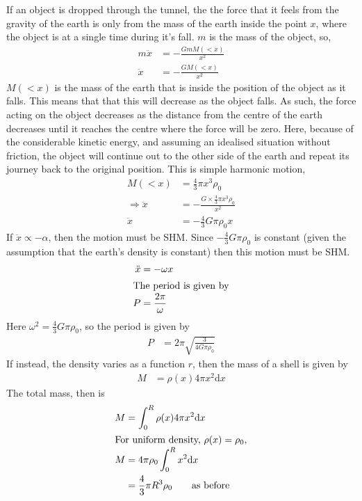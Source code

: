 \documentclass[british]{article}
\renewcommand{\d}{\mathrm{d}} %
\newcommand{\sintertext}[1]{\intertext{#1}\\[-0.7cm]}
\begin{document}
If an object is dropped through the tunnel, the the force that it feels from the gravity of the earth is only from the mass of the earth inside the point $x$, where the object is at a single time during it's fall. $m$ is the mass of the object, so,
\begin{align*}
	m\ddot{x} &= -\frac{GmM(<x)}{x^2} \\
	\ddot{x} &= -\frac{GM(<x)}{x^2}
\end{align*}
$M(<x)$ is the mass of the earth that is inside the position of the object as it falls. This means that that this will decrease as the object falls. As such, the force acting on the object decreases as the distance from the centre of the earth decreases until it reaches the centre where the force will be zero. Here, because of the considerable kinetic energy, and assuming an idealised situation without friction, the object will continue out to the other side of the earth and repeat its journey back to the original position. This is simple harmonic motion,
\begin{align*}
	M(<x) &= \frac{4}{3} \pi x^3 \rho_0 \\
	\Rightarrow \ddot{x} &= -\frac{G\times \frac{4}{3} \pi x^3 \rho_0}{x^2} \\
	\ddot{x} &= -\frac{4}{3}G\pi\rho_0 x
\end{align*}
If $\ddot{x} \propto -\alpha$, then the motion must be SHM. Since $-\frac{4}{3}G\pi\rho_0$ is constant (given the assumption that the earth's density is constant) then this motion must be SHM.
\begin{align*}
	\ddot{x} &= -\omega x \\
\sintertext{The period is given by}
	P &= \frac{2\pi}{\omega} 
\end{align*}
Here $\omega^2=\frac{4}{3}G\pi\rho_0$, so the period is given by
\begin{align*}
	P &= 2\pi \sqrt{\frac{3}{4G\pi\rho_0}}
\end{align*}
If instead, the density varies as a function $r$, then the mass of a shell is given by
\begin{align*}
	M &= \rho(x) 4\pi x^2 \d{x}
\end{align*}
The total mass, then is
\begin{align*}
	M &= \int_0^R \rho(x) 4\pi x^2 \d{x}\\
\sintertext{For uniform density, $\rho(x)=\rho_0$,}
	M &= 4\pi \rho_0 \int_0^R x^2\d{x} \\
	&= \frac{4}{3} \pi R^3 \rho_0 \qquad \text{as before}
\end{align*}
\end{document}
